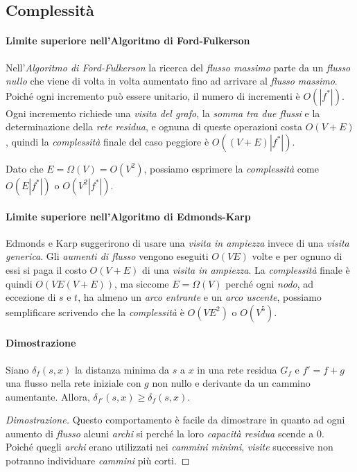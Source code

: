 \subsection{Complessità}
\paragraph{Limite superiore nell'Algoritmo di Ford-Fulkerson}
Nell'\emph{Algoritmo di Ford-Fulkerson} la ricerca del \emph{flusso massimo}
parte da un \emph{flusso nullo} che viene di volta in volta aumentato fino ad
arrivare al \emph{flusso massimo}. Poiché ogni incremento può essere unitario,
il numero di incrementi è $O(|f^*|)$. Ogni incremento richiede una \emph{visita
del grafo}, la \emph{somma tra due flussi} e la determinazione della \emph{rete
residua}, e ognuna di queste operazioni costa $O(V+E)$, quindi la
\emph{complessità} finale del caso peggiore è $O((V+E)|f^*|)$.

\begin{note}
    Dato che $E=\Omega(V)=O(V^2)$, possiamo esprimere la \emph{complessità} come
    $O(E|f^*|)$ o $O(V^2|f^*|)$.
\end{note}

\paragraph{Limite superiore nell'Algoritmo di Edmonds-Karp}
Edmonds e Karp suggerirono di usare una \emph{visita in ampiezza} invece di una
\emph{visita generica}. Gli \emph{aumenti di flusso} vengono eseguiti $O(VE)$
volte e per ognuno di essi si paga il costo $O(V+E)$ di una \emph{visita in
ampiezza}. La \emph{complessità} finale è quindi $O(VE(V+E))$, ma siccome
$E=\Omega(V)$ perché ogni \emph{nodo}, ad eccezione di $s$ e $t$, ha almeno
un \emph{arco entrante} e un \emph{arco uscente}, possiamo semplificare
scrivendo che la \emph{complessità} è $O(VE^2)$ o $O(V^5)$.

\paragraph{Dimostrazione}
\begin{definition}[Monotonia]
    Siano $\delta_f(s,x)$ la distanza minima da $s$ a $x$ in una rete residua
    $G_f$ e $f'=f+g$ una flusso nella rete iniziale con $g$ non nullo e
    derivante da un cammino aumentante. Allora, $\delta_{f'}(s,x)\geq\delta_f(s,x)$.
\end{definition}
\begin{proof}[Dimostrazione]
    Questo comportamento è facile da dimostrare in quanto ad ogni aumento di
    \emph{flusso} alcuni \emph{archi} si  perché la loro
    \emph{capacità residua} scende a $0$. Poiché quegli \emph{archi} erano
    utilizzati nei \emph{cammini minimi}, \emph{visite} successive non potranno
    individuare \emph{cammini} più corti.
\end{proof}

